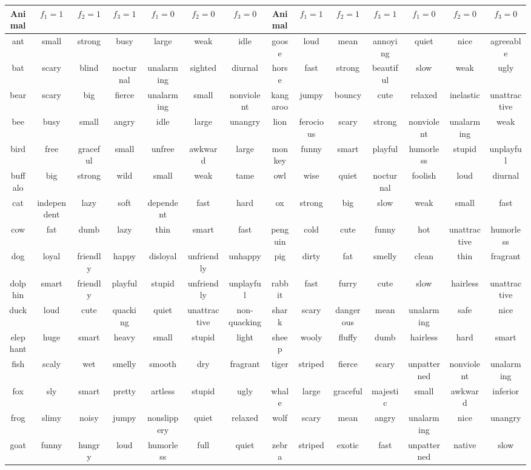 \documentclass[10pt,letterpaper]{article}
\begin{document}
\begin{table}[t]
\tabcolsep=0.05cm
\fontsize{8}{7.2}\selectfont
\begin{tabular}{a c c c c c c | a c c c c c c}
\toprule
Animal & $f_1=1$ & $f_2=1$ & $f_3=1$ & $f_1=0$ & $f_2=0$ & $f_3=0$ & Animal & $f_1=1$ & $f_2=1$ & $f_3=1$ & $f_1=0$ & $f_2=0$ & $f_3=0$ \\\hline
ant & small & strong & busy & large & weak & idle & goose & loud & mean & annoying & quiet & nice & agreeable \\
bat & scary & blind & nocturnal & unalarming & sighted & diurnal & horse & fast & strong & beautiful & slow & weak & ugly \\
bear & scary & big & fierce & unalarming & small & nonviolent & kangaroo & jumpy & bouncy & cute & relaxed & inelastic & unattractive \\
bee & busy & small & angry & idle & large & unangry & lion & ferocious & scary & strong & nonviolent & unalarming & weak \\
bird & free & graceful & small & unfree & awkward & large & monkey & funny & smart & playful & humorless & stupid & unplayful \\
buffalo & big & strong & wild & small & weak & tame & owl & wise & quiet & nocturnal & foolish & loud & diurnal \\
cat & independent & lazy & soft & dependent & fast & hard & ox & strong & big & slow & weak & small & fast \\
cow & fat & dumb & lazy & thin & smart & fast & penguin & cold & cute & funny & hot & unattractive & humorless \\
dog & loyal & friendly & happy & disloyal & unfriendly & unhappy & pig & dirty & fat & smelly & clean & thin & fragrant \\
dolphin & smart & friendly & playful & stupid & unfriendly & unplayful & rabbit & fast & furry & cute & slow & hairless & unattractive \\
duck & loud & cute & quacking & quiet & unattractive & non-quacking & shark & scary & dangerous & mean & unalarming & safe & nice \\
elephant & huge & smart & heavy & small & stupid & light & sheep & wooly & fluffy & dumb & hairless & hard & smart \\
fish & scaly & wet & smelly & smooth & dry & fragrant & tiger & striped & fierce & scary & unpatterned & nonviolent & unalarming \\
fox & sly & smart & pretty & artless & stupid & ugly & whale & large & graceful & majestic & small & awkward & inferior \\
frog & slimy & noisy & jumpy & nonslippery & quiet & relaxed & wolf & scary & mean & angry & unalarming & nice & unangry \\
goat & funny & hungry & loud & humorless & full & quiet & zebra & striped & exotic & fast & unpatterned & native & slow \\
\bottomrule


\end{tabular}
\end{table}
\end{document}
